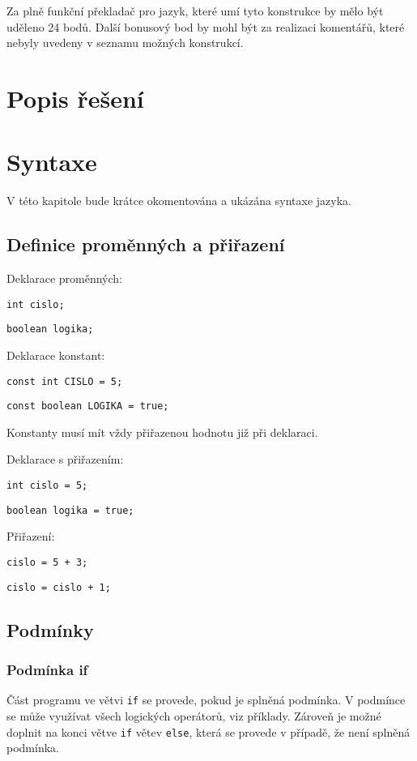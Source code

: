 \documentclass[czech]{thesiskiv}
\begin{document}
\noindent Za plně funkční překladač pro jazyk, které umí tyto konstrukce by mělo být uděleno 24 bodů.
Další bonusový bod by mohl být za realizaci komentářů, které nebyly uvedeny v seznamu možných konstrukcí.

\chapter{Popis řešení}

\chapter{Syntaxe}
V této kapitole bude krátce okomentována a ukázána syntaxe jazyka.

\section{Definice proměnných a přiřazení}

Deklarace proměnných:

\texttt{int cislo;}

\texttt{boolean logika;}

\noindent Deklarace konstant:

\texttt{const int CISLO = 5;}

\texttt{const boolean LOGIKA = true;}

\noindent Konstanty musí mít vždy přiřazenou hodnotu již při deklaraci.

\noindent Deklarace s přiřazením: 

\texttt{int cislo = 5;}

\texttt{boolean logika = true;}

\noindent Přiřazení:

\texttt{cislo = 5 + 3;}

\texttt{cislo = cislo + 1;}

\section{Podmínky}
\subsection{Podmínka if}
Část programu ve větvi \texttt{if} se provede, pokud je splněná podmínka.
V podmínce se může využívat všech logických operátorů, viz příklady.
Zároveň je možné doplnit na konci větve \texttt{if} větev \texttt{else}, která 
se provede v případě, že není splněná podmínka.
\end{document}
